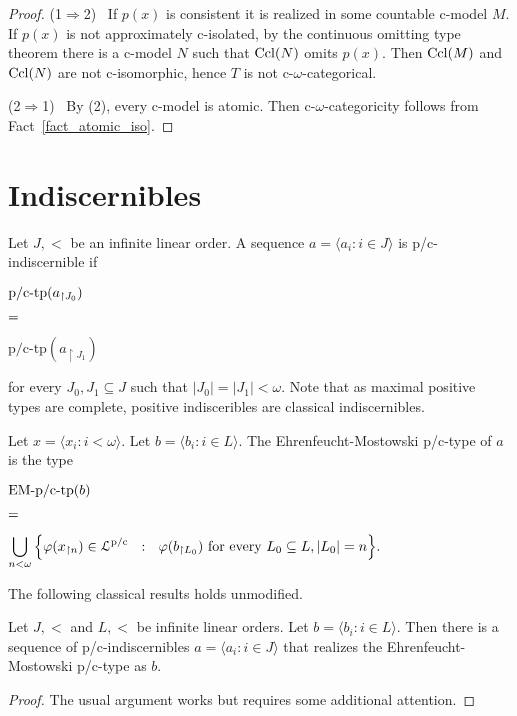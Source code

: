 \documentclass{amsproc}
\begin{document}
{\begin{proof}
  (1$\Rightarrow$2) \ 
  If $p(x)$ is consistent it is realized in some countable c-model $M$.
  If $p(x)$ is not approximately c-isolated, by the continuous omitting type theorem there is a c-model $N$ such that  ${\rm Ccl}(N)$ omits $p(x)$.
  Then ${\rm Ccl}(M)$ and ${\rm Ccl}(N)$ are not c-isomorphic, hence $T$ is not c-$\omega$-categorical.

  (2$\Rightarrow$1) \ 
  By (2), every c-model is atomic.
  Then c-$\omega$-categoricity follows from Fact~\ref{fact_atomic_iso}.
\end{proof}

\section{Indiscernibles}

\def\ceq#1#2#3{\parbox[t]{15ex}{$\displaystyle #1$}\parbox[t]{6ex}{$\displaystyle\hfil #2$}{$\displaystyle #3$}}

Let $J,<$ be an infinite linear order.
A sequence $a=\langle a_i:i\in J\rangle$ is p/c-indiscernible if 

\ceq{\hfill\mbox{p/c-tp}(a_{\restriction J_0})}{=}{\mbox{p/c-tp}(a_{\restriction J_1})}

for every $J_0,J_1\subseteq J$ such that $|J_0|=|J_1|<\omega$.
Note that as maximal positive types are complete, positive indisceribles are classical indiscernibles.

Let $x=\langle x_i:i<\omega\rangle$.
Let $b=\langle b_i:i\in L\rangle$. 
The Ehrenfeucht-Mostowski p/c-type of $a$ is the type

\ceq{\hfill\mbox{EM-p/c-tp}(b)}{=}{\bigcup_{n<\omega}\Big\{\varphi(x_{\restriction n})\in{\EuScript L}^{\rm p/c}\ \ :\ \ \varphi(b_{\restriction L_0})\textrm{ for every } L_0\subseteq L, |L_0|=n\Big\}.}

The following classical results holds unmodified.

\begin{theorem}\label{thm_EM}
  Let $J,<$ and $L,<$ be infinite linear orders.
  Let $b=\langle b_i:i\in L\rangle$.
  Then there is a sequence of p/c-indiscernibles $a=\langle a_i:i\in J\rangle$ that realizes the Ehrenfeucht-Mostowski p/c-type as $b$.
\end{theorem}

\begin{proof}
  The usual argument works but requires some additional attention.


\end{proof}}
\end{document}
